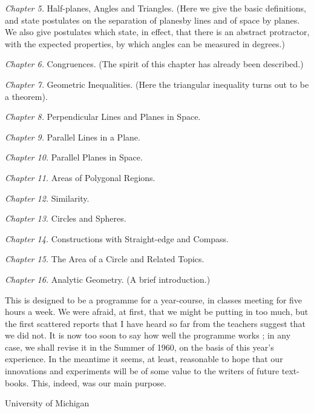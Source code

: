 \smallskip
\textit{Chapter 5.} Half-planes, Angles and Triangles. (Here we give
the basic definitions, and state postulates on the separation of
planes\pageoriginale by lines and of space by planes. We also give postulates which
state, in effect, that there is an abstract protractor, with the
expected properties, by which angles can be measured in degrees.)

\smallskip
\textit{Chapter 6.} Congruences. (The spirit of this chapter has
already been described.)

\smallskip
\textit{Chapter 7.} Geometric Inequalities. (Here the triangular
inequality turns out to be a theorem).

\smallskip
\textit{Chapter 8.} Perpendicular Lines and Planes in Space.

\smallskip
\textit{Chapter 9.} Parallel Lines in a Plane. 

\smallskip
\textit{Chapter 10.} Parallel Planes in Space.

\smallskip
\textit{Chapter 11.} Areas of Polygonal Regions.

\smallskip
\textit{Chapter 12.} Similarity.

\smallskip
\textit{Chapter 13.} Circles and Spheres.

\smallskip
\textit{Chapter 14.} Constructions with Straight-edge and Compass.

\smallskip
\textit{Chapter 15.} The Area of a Circle and Related Topics. 

\smallskip
\textit{Chapter 16.} Analytic Geometry. (A brief introduction.)

\smallskip

This is designed to be a programme for a year-course, in classes
meeting for five hours a week. We were afraid, at first, that we might
be putting in too much, but the first scattered reports that I have
heard so far from the teachers suggest that we did not. It is now too
soon to say how well the programme works ; in any case, we shall
revise it in the Summer of 1960, on the basis of this year's
experience. In the meantime it seems, at least, reasonable to hope
that our innovations and experiments will be of some value to the
writers of future text-books. This, indeed, was our main purpose.

\bigskip
\bigskip

{\fontsize{9pt}{12pt}\selectfont
University of Michigan}\relax








